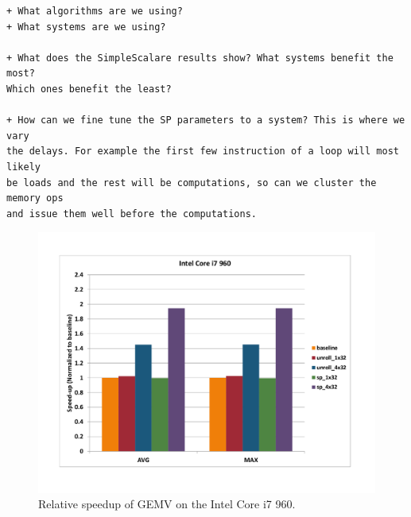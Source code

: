 \documentclass[10pt]{article}
\begin{document}
\begin{verbatim}
+ What algorithms are we using?
+ What systems are we using?

+ What does the SimpleScalare results show? What systems benefit the most?
Which ones benefit the least?

+ How can we fine tune the SP parameters to a system? This is where we vary
the delays. For example the first few instruction of a loop will most likely
be loads and the rest will be computations, so can we cluster the memory ops
and issue them well before the computations.

\end{verbatim}


\begin{figure}[ht]
\begin{center}
\includegraphics[scale=.5]{gemv_intel_core_i7_960.png}
\end{center}
\caption{Relative speedup of GEMV on the Intel Core i7 960.}
\label{fig:gemv_corei7}
\end{figure}
\end{document}
